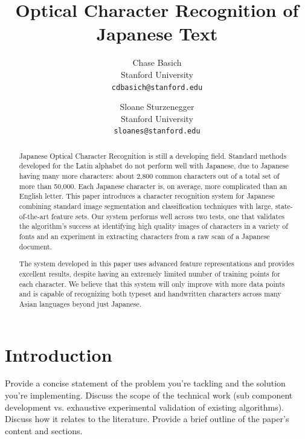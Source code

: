 \documentclass[10pt,twocolumn,letterpaper]{article}
\begin{document}
\title{Optical Character Recognition of Japanese Text}

\author{Chase Basich\\
Stanford University\\
{\tt\small cdbasich@stanford.edu}
\and
Sloane Sturzenegger\\
Stanford University\\
{\tt\small sloanes@stanford.edu}
}

\maketitle

\begin{abstract}
Japanese Optical Character Recognition is still a developing field. Standard methods developed for the Latin alphabet do not perform well with Japanese, due to Japanese having many more characters: about 2,800 common characters out of a total set of more than 50,000. Each Japanese character is, on average, more complicated than an English letter. This paper introduces a character recognition system for Japanese combining standard image segmentation and classification techniques with large, state-of-the-art feature sets. Our system performs well across two tests, one that validates the algorithm’s success at identifying high quality images of characters in a variety of fonts and an experiment in extracting characters from a raw scan of a Japanese document.

The system developed in this paper uses advanced feature representations and provides excellent results, despite having an extremely limited number of training points for each character. We believe that this system will only improve with more data points and is capable of recognizing both typeset and handwritten characters across many Asian languages beyond just Japanese.
\end{abstract}

\section{Introduction}
Provide a concise statement of the problem you’re tackling and the solution you’re implementing. Discuss the scope of the technical work (sub component development vs. exhaustive experimental validation of existing algorithms). Discuss how it relates to the literature. Provide a brief outline of the paper’s content and sections.
\end{document}
